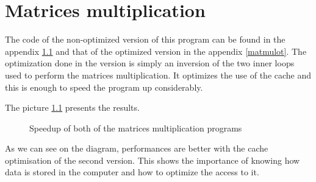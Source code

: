 \chapter{Matrices multiplication}

The code of the non-optimized version of this program can be found in the appendix \ref{matmul} and that of the optimized version in the appendix \ref{matmulot}. 
The optimization done in the version is simply an inversion of the two inner loops used to perform the matrices multiplication. It optimizes the use of the cache and this is enough to speed the program up considerably.

The picture \ref{matmul} presents the results.

\begin{figure}[h]
  \begin{center}
  \end{center}
  \caption{Speedup of both of the matrices multiplication programs}
  \label{matmul}
\end{figure}

As we can see on the diagram, performances are better with the cache optimisation of the second version. This shows the importance of knowing how data is stored in the computer and how to optimize the access to it.

